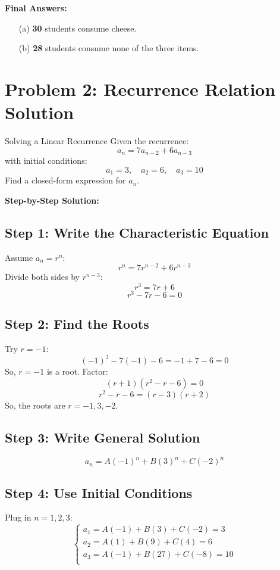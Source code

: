 \documentclass[14pt,a4paper]{article}
\begin{document}
\vspace{1em}

\textbf{Final Answers:}
\begin{itemize}
    \item[(a)] \textbf{30} students consume cheese.
    \item[(b)] \textbf{28} students consume none of the three items.
\end{itemize}


\section*{Problem 2: Recurrence Relation Solution}

\begin{myproblem}{Solving a Linear Recurrence}
Given the recurrence:
\[
a_n = 7a_{n-2} + 6a_{n-3}
\]
with initial conditions:
\[
a_1 = 3, \quad a_2 = 6, \quad a_3 = 10
\]
Find a closed-form expression for $a_n$.
\end{myproblem}

\textbf{Step-by-Step Solution:}

\subsection*{Step 1: Write the Characteristic Equation}
Assume $a_n = r^n$:
\[
r^n = 7 r^{n-2} + 6 r^{n-3}
\]
Divide both sides by $r^{n-3}$:
\[
r^3 = 7r + 6
\]
\[
r^3 - 7r - 6 = 0
\]

\subsection*{Step 2: Find the Roots}
Try $r = -1$:
\[
(-1)^3 - 7(-1) - 6 = -1 + 7 - 6 = 0
\]
So, $r = -1$ is a root. Factor:
\[
(r + 1)(r^2 - r - 6) = 0
\]
\[
r^2 - r - 6 = (r - 3)(r + 2)
\]
So, the roots are $r = -1, 3, -2$.

\subsection*{Step 3: Write General Solution}
\[
a_n = A(-1)^n + B(3)^n + C(-2)^n
\]

\subsection*{Step 4: Use Initial Conditions}
Plug in $n=1,2,3$:
\[
\begin{cases}
a_1 = A(-1) + B(3) + C(-2) = 3 \\
a_2 = A(1) + B(9) + C(4) = 6 \\
a_3 = A(-1) + B(27) + C(-8) = 10 \\
\end{cases}
\]
\end{document}

